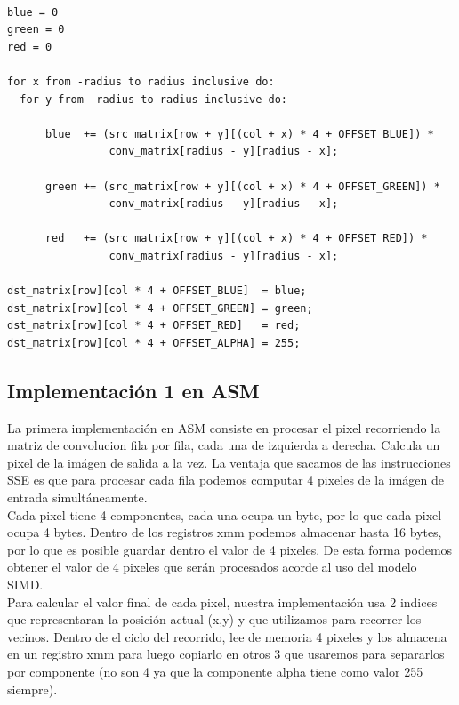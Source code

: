 \documentclass[10pt,a4paper,spanish]{article}
\begin{document}
\begin{codesnippet}
\begin{verbatim}

blue = 0
green = 0
red = 0

for x from -radius to radius inclusive do:
  for y from -radius to radius inclusive do:

      blue  += (src_matrix[row + y][(col + x) * 4 + OFFSET_BLUE]) *
                conv_matrix[radius - y][radius - x];

      green += (src_matrix[row + y][(col + x) * 4 + OFFSET_GREEN]) *
                conv_matrix[radius - y][radius - x];

      red   += (src_matrix[row + y][(col + x) * 4 + OFFSET_RED]) *
                conv_matrix[radius - y][radius - x];

dst_matrix[row][col * 4 + OFFSET_BLUE]  = blue;
dst_matrix[row][col * 4 + OFFSET_GREEN] = green;
dst_matrix[row][col * 4 + OFFSET_RED]   = red;
dst_matrix[row][col * 4 + OFFSET_ALPHA] = 255;

\end{verbatim}
\end{codesnippet}

\subsection{Implementación 1 en ASM}

La primera implementación en ASM consiste en procesar el pixel recorriendo la matriz de convolucion fila por fila, cada una de izquierda a derecha.
Calcula un pixel de la imágen de salida a la vez. La ventaja que sacamos de las instrucciones SSE es que para procesar cada fila podemos computar 4 pixeles de la imágen de entrada simultáneamente. \\

Cada pixel tiene 4 componentes, cada una ocupa un byte, por lo que cada pixel ocupa 4 bytes. Dentro de los registros xmm podemos almacenar hasta 16 bytes, por lo que es posible guardar dentro el valor de 4 pixeles. De esta forma podemos obtener el valor de 4 pixeles que serán procesados acorde al uso del modelo SIMD. \\

Para calcular el valor final de cada pixel, nuestra implementación usa 2 indices que representaran la posición actual (x,y) y que utilizamos para recorrer los vecinos. Dentro de el ciclo del recorrido, lee de memoria 4 pixeles y los almacena en un registro xmm para luego copiarlo en otros 3 que usaremos para separarlos por componente (no son 4 ya que la componente alpha tiene como valor 255 siempre).
\end{document}
